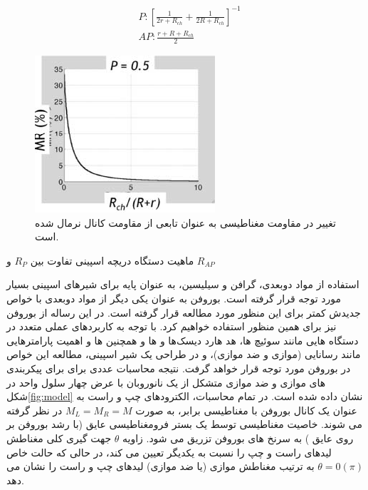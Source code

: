 \begin{equation}
  \begin{aligned}
  & P:{{\left[ \frac{1}{2r+{{R}_{ch}}}+\frac{1}{2R+{{R}_{ch}}} \right]}^{-1}} \\ 
 & AP:\frac{r+R+{{R}_{ch}}}{2}  
  \end{aligned}
\end{equation}

\begin{figure}
  \centering
  \includegraphics{./figures/MR-theory.png}
  \caption{تغییر در مقاومت مغناطیسی  به عنوان تابعی از مقاومت کانال نرمال شده است.}
  \label{fig:MRtheory}
\end{figure}
ماهیت دستگاه دریچه اسپینی تفاوت بین $R_P$ و $R_{AP}$ %

استفاده از مواد دوبعدی، گرافن و سیلیسین، به عنوان پایه برای شیرهای اسپینی بسیار مورد توجه قرار گرفته است. بوروفن به عنوان یکی دیگر از مواد دوبعدی با خواص جدیدش کمتر برای این منظور مورد مطالعه قرار گرفته است. در این رساله از بوروفن نیز برای همین منظور استفاده خواهیم کرد. با توجه به کاربردهای عملی متعدد در دستگاه هایی مانند سوئیچ ها، هد هارد دیسک‌ها و ها و همچنین ‌ها و اهمیت پارامترهایی مانند رسانایی (موازی و ضد موازی)،  و  در طراحی یک شیر اسپینی، مطالعه این خواص در بوروفن مورد توجه قرار خواهد گرفت. نتیجه محاسبات عددی برای  برای پیکربندی های موازی  و ضد موازی  متشکل از یک نانوروبان با عرض چهار سلول واحد در شکل\ref{fig:model} نشان داده شده است. در تمام محاسبات، الکترودهای چپ و راست به عنوان یک کانال بوروفن با مغناطیسی برابر، به صورت $M_L = M_R = M$ در نظر گرفته می شوند. خاصیت مغناطیسی توسط یک بستر فرومغناطیسی عایق (با رشد بوروفن بر روی عایق ) به سرنخ های بوروفن تزریق می شود. زاویه $\theta$ جهت گیری کلی مغناطش لیدهای راست و چپ را نسبت به یکدیگر تعیین می کند، در حالی که حالت خاص $\theta = 0 (\pi)$ به ترتیب مغناطش موازی (یا ضد موازی) لیدهای چپ و راست را نشان می دهد.

